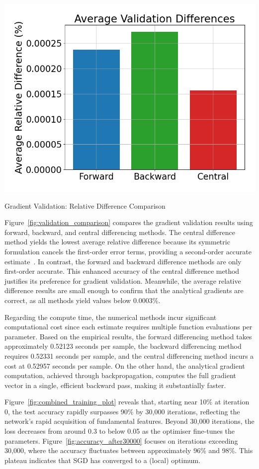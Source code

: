 \begin{table}
    \centering
    \includegraphics[width=\linewidth]{../data/part1/validation_comparison}
    \caption{Gradient Validation: Relative Difference Comparison}
    \label{fig:validation_comparison}
\end{table}

Figure~\ref{fig:validation_comparison} compares the gradient validation results using forward, backward, and central differencing methods. The central difference method yields the lowest average relative difference because its symmetric formulation cancels the first-order error terms, providing a second-order accurate estimate~\cite{burden2000numerical}. In contrast, the forward and backward difference methods are only first-order accurate. This enhanced accuracy of the central difference method justifies its preference for gradient validation. Meanwhile, the average relative difference results are small enough to confirm that the analytical gradients are correct, as all methods yield values below 0.0003\%.

Regarding the compute time, the numerical methods incur significant computational cost since each estimate requires multiple function evaluations per parameter. Based on the empirical results, the forward differencing method takes approximately 0.52123 seconds per sample, the backward differencing method requires 0.52331 seconds per sample, and the central differencing method incurs a cost at 0.52957 seconds per sample. On the other hand, the analytical gradient computation, achieved through backpropagation, computes the full gradient vector in a single, efficient backward pass, making it substantially faster.

Figure~\ref{fig:combined_training_plot} reveals that, starting near 10\% at iteration 0, the test accuracy rapidly surpasses 90\% by 30{,}000 iterations, reflecting the network’s rapid acquisition of fundamental features. Beyond 30{,}000 iterations, the loss decreases from around 0.3 to below 0.05 as the optimiser fine-tunes the parameters. Figure~\ref{fig:accuracy_after30000} focuses on iterations exceeding 30{,}000, where the accuracy fluctuates between approximately 96\% and 98\%. This plateau indicates that SGD has converged to a (local) optimum.

